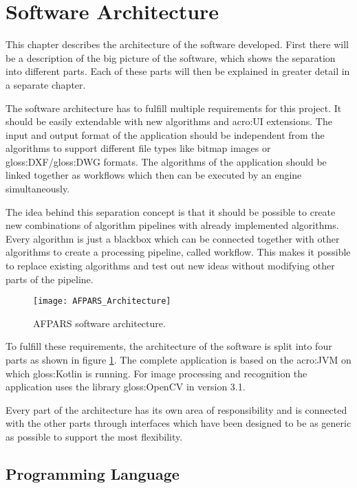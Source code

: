 \section{Software Architecture}
This chapter describes the architecture of the software developed. First there will be a description of the big picture of the software, which shows the separation into different parts. Each of these parts will then be explained in greater detail in a separate chapter.

The software architecture has to fulfill multiple requirements for this project. It should be easily extendable with new algorithms and \acrshort{acro:UI} extensions. The input and output format of the application should be independent from the algorithms to support different file types like bitmap images or \gls{gloss:DXF}/\gls{gloss:DWG} formats. The algorithms of the application should be linked together as workflows which then can be executed by an engine simultaneously.

The idea behind this separation concept is that it should be possible to create new combinations of algorithm pipelines with already implemented algorithms. Every algorithm is just a blackbox which can be connected together with other algorithms to create a processing pipeline, called workflow. This makes it possible to replace existing algorithms and test out new ideas without modifying other parts of the pipeline. 

\begin{figure}[H]
  \centering
      \texttt{[image: AFPARS\_Architecture]}
  \caption{AFPARS software architecture.}
  \label{fig:AFPARS_Architecture}
\end{figure}


To fulfill these requirements, the architecture of the software is split into four parts as shown in figure \ref{fig:AFPARS_Architecture}. The complete application is based on the \acrfull{acro:JVM} on which \gls{gloss:Kotlin} is running. For image processing and recognition the application uses the library \gls{gloss:OpenCV} in version 3.1.

Every part of the architecture has its own area of responsibility and is connected with the other parts through interfaces which have been designed to be as generic as possible to support the most flexibility.

\subsection{Programming Language}

